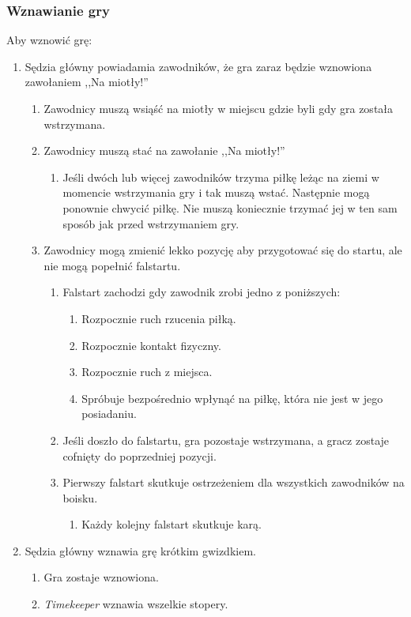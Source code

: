 \documentclass[11pt,a4paper]{article}
\begin{document}
\subsubsection{Wznawianie gry}
Aby wznowić grę:
\begin{enumerate}
  \item Sędzia główny powiadamia zawodników, że gra zaraz będzie wznowiona zawołaniem ,,Na miotły!''
  \begin{enumerate}
    \item Zawodnicy muszą wsiąść na miotły w miejscu gdzie byli gdy gra została wstrzymana.
    \item Zawodnicy muszą stać na zawołanie ,,Na miotły!''
    \begin{enumerate}
      \item Jeśli dwóch lub więcej zawodników trzyma piłkę leżąc na ziemi w momencie wstrzymania gry i tak muszą wstać. Następnie mogą ponownie chwycić piłkę. Nie muszą koniecznie trzymać jej w ten sam sposób jak przed wstrzymaniem gry.
    \end{enumerate}
    \item Zawodnicy mogą zmienić lekko pozycję aby przygotować się do startu, ale nie mogą popełnić falstartu.
    \begin{enumerate}
      \item Falstart zachodzi gdy zawodnik zrobi jedno z poniższych:
      \begin{enumerate}
        \item Rozpocznie ruch rzucenia piłką.
        \item Rozpocznie kontakt fizyczny.
        \item Rozpocznie ruch z miejsca.
        \item Spróbuje bezpośrednio wpłynąć na piłkę, która nie jest w jego posiadaniu.
      \end{enumerate}
      \item Jeśli doszło do falstartu, gra pozostaje wstrzymana, a gracz zostaje cofnięty do poprzedniej pozycji.
      \item Pierwszy falstart skutkuje ostrzeżeniem dla wszystkich zawodników na boisku.
      \begin{enumerate}
        \item Każdy kolejny falstart skutkuje karą.
      \end{enumerate}
    \end{enumerate}
  \end{enumerate}
  \item Sędzia główny wznawia grę krótkim gwizdkiem.
  \begin{enumerate}
    \item Gra zostaje wznowiona.
    \item \emph{Timekeeper} wznawia wszelkie stopery.
  \end{enumerate}
\end{enumerate}
\end{document}
